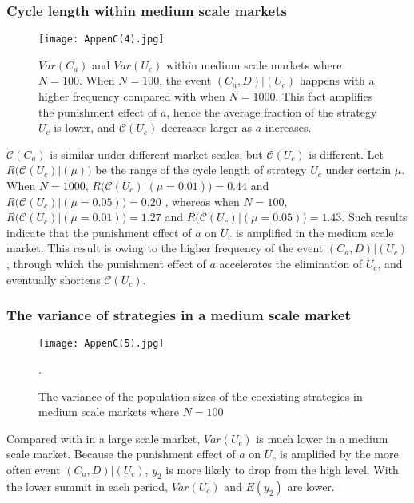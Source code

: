 \documentclass[letterpaper,10pt]{article}
\numberwithin{equation}{section}
\begin{document}
\subsubsection{Cycle length within medium scale markets}\label{AppendixC3_100}
\begin{figure}[H] %
    \begin{center}
        \texttt{[image: AppenC(4).jpg]}
    \end{center}
    \caption{$ Var(C_{a}) $ and $ Var(U_{c}) $ within medium scale markets where $ N = 100 $. When $ N = 100 $, the event $ (C_{a}, D)|(U_{c}) $ happens with a higher frequency compared with when $ N = 1000 $. This fact amplifies the punishment effect of $ a $, hence the average fraction of the strategy $ U_{c} $ is lower, and $ \mathscr{C}(U_{c}) $ decreases larger as $ a $ increases.}
    \label{Fig8b}
\end{figure}

$ \mathscr{C}(C_{a}) $ is similar under different market scales, but $ \mathscr{C}(U_{c}) $ is different. Let $ R\bigl(\mathscr{C}(U_{c})|(\mu)\bigr) $ be the range of the cycle length of strategy $ U_{c} $ under certain $ \mu $. When $ N = 1000 $, $ R\bigl(\mathscr{C}(U_{c})|(\mu=0.01)\bigr)=0.44 $ and $ R\bigl(\mathscr{C}(U_{c})|(\mu=0.05)\bigr)=0.20 $ , whereas when $ N = 100 $, $ R\bigl(\mathscr{C}(U_{c})|(\mu=0.01)\bigr)=1.27 $ and $ R\bigl(\mathscr{C}(U_{c})|(\mu=0.05)\bigr)=1.43 $. Such results indicate that the punishment effect of $ a $ on $ U_{c} $ is amplified in the medium scale market. This result is owing to the higher frequency of the event $ (C_{a}, D)|(U_{c}) $, through which the punishment effect of $ a $ accelerates the elimination of $ U_{c} $, and eventually shortens $ \mathscr{C}(U_{c}) $.

\subsubsection{The variance of strategies in a medium scale market} \label{AppendixC32}
\begin{figure}[H]
    \begin{center}
        \texttt{[image: AppenC(5).jpg]}
    \end{center}
    \caption{The variance of the population sizes of the coexisting strategies in medium scale markets where $ N = 100 $}.
    \label{AppenC3}
\end{figure}

Compared with in a large scale market, $ Var(U_{c}) $ is much lower in a medium scale market. Because the punishment effect of $ a $ on $ U_{c} $ is amplified by the more often event $ (C_{a}, D)|(U_{c}) $, $ y_{2} $ is more likely to drop from the high level. With the lower summit in each period, $ Var(U_{c}) $ and $ E(y_{2}) $ are lower.
\end{document}
